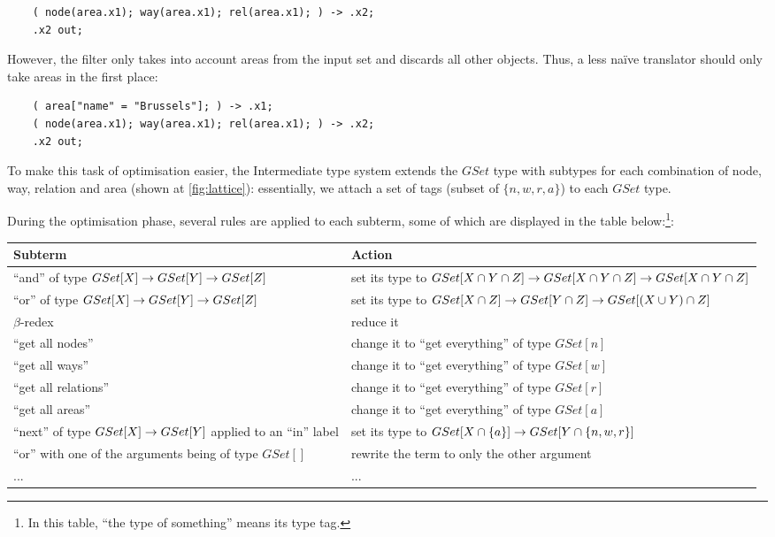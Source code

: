 \documentclass[main.tex]{subfiles}
\begin{document}
\begin{example}
\begin{lstwrap}
\begin{lstlisting}
    ( node(area.x1); way(area.x1); rel(area.x1); ) -> .x2;
    .x2 out;
\end{lstlisting}\end{lstwrap}
However, the  filter only takes into account areas from the
input set and discards all other objects. Thus, a less naïve translator should
only take areas in the first place:
\begin{lstwrap}\begin{lstlisting}
    ( area["name" = "Brussels"]; ) -> .x1;
    ( node(area.x1); way(area.x1); rel(area.x1); ) -> .x2;
    .x2 out;
\end{lstlisting}\end{lstwrap}
\end{example}

To make this task of optimisation easier, the Intermediate type system extends the $GSet$
type with subtypes for each combination of node, way, relation and area
(shown at \cref{fig:lattice}): essentially, we attach a set of tags (subset
of $\{ n, w, r, a \}$) to each $GSet$ type.

During the optimisation phase, several rules are applied to each subterm, some of which are displayed in the table below:\footnote{
    In this table, ``the type of something'' means its type tag.
}:
\begin{center}
\begin{tabular}{|p{}|p{}|}
    \hline
    Subterm & Action \\
    \hline
    ``and'' of type $GSet[X] \rightarrow GSet[Y] \rightarrow GSet[Z]$
        & set its type to $GSet[X \cap Y \cap Z] \rightarrow GSet[X \cap Y \cap Z] \rightarrow GSet[X \cap Y \cap Z]$ \\
    \hline
    ``or'' of type $GSet[X] \rightarrow GSet[Y] \rightarrow GSet[Z]$
        & set its type to $GSet[X \cap Z] \rightarrow GSet[Y \cap Z] \rightarrow GSet[(X \cup Y) \cap Z]$ \\
    \hline
    $\beta$-redex & reduce it \\
    \hline
    ``get all nodes'' & change it to ``get everything'' of type $GSet[n]$ \\
    ``get all ways'' & change it to ``get everything'' of type $GSet[w]$ \\
    ``get all relations'' & change it to ``get everything'' of type $GSet[r]$ \\
    ``get all areas'' & change it to ``get everything'' of type $GSet[a]$ \\
    \hline
    ``next'' of type $GSet[X] \rightarrow GSet[Y]$ applied to an ``in'' label
        & set its type to $GSet[X \cap \{ a \}] \rightarrow GSet[Y \cap \{ n, w, r \}]$ \\
    \hline
    ``or'' with one of the arguments being of type $GSet[]$
        & rewrite the term to only the other argument \\
    \hline
    ... & ... \\
    \hline
\end{tabular}
\end{center}
\end{document}
